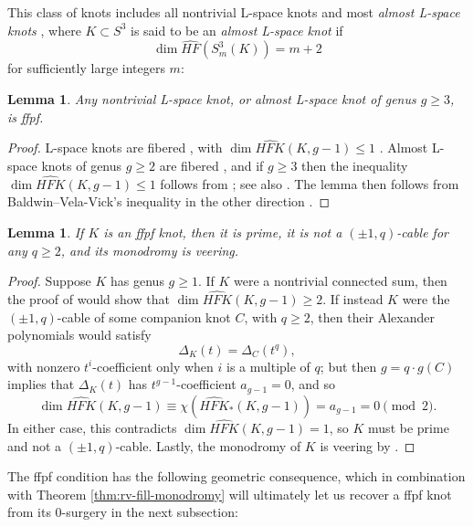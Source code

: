 \documentclass[11pt]{amsart}
\newtheorem {lemma}[theorem]{Lemma}
\numberwithin{equation}{section}
\numberwithin{theorem}{section}
\theoremstyle{definition}
\newcommand\hfk{\mathit{HFK}}
\newcommand\hfkhat{\widehat{\hfk}}
\newcommand{\hfhat}{\widehat{\mathit{HF}}}
\begin{document}
This class of knots includes all nontrivial L-space knots and most \emph{almost L-space knots} \cite{bs-characterizing}, where  $K\subset S^3$ is  said to be an \emph{almost L-space knot}  if \[\dim\hfhat(S^3_m(K)) = m+2\] for sufficiently large integers $m$:

\begin{lemma} \label{lem:ffpf-examples}
Any nontrivial L-space knot, or almost L-space knot of genus $g\geq 3$, is ffpf.
\end{lemma}

\begin{proof}
L-space knots are fibered \cite{ghiggini,ni-hfk}, with $\dim \hfkhat(K,g-1) \leq 1$  \cite[Theorem~1.2]{osz-lens}.  Almost L-space knots of genus $g \geq 2$ are fibered  \cite[Proposition~3.9]{bs-characterizing}, and if $g \geq 3$ then the inequality $\dim \hfkhat(K,g-1) \leq 1$ follows from \cite[Remark~3.12]{bs-characterizing}; see also \cite{binns-almost}. The lemma then follows from Baldwin--Vela-Vick's  inequality in the other direction \cite{baldwin-velavick}.
\end{proof}


\begin{lemma} \label{lem:hfk-outer-monodromy}
If  $K$ is an ffpf knot, then it is prime, it is not a $(\pm1,q)$-cable for any $q \geq 2$, and its monodromy is veering. 
\end{lemma}

\begin{proof}
Suppose $K$ has genus $g\geq 1$. If $K$ were a nontrivial connected sum, then the proof of \cite[Corollary~1.4]{baldwin-velavick}  would show that $\dim \hfkhat(K,g-1) \geq 2$.  If instead $K$ were the $(\pm1,q)$-cable of some companion knot $C$, with $q \geq 2$, then their Alexander polynomials  would satisfy
\[ \Delta_K(t) = \Delta_C(t^q), \]
with nonzero $t^i$-coefficient only when $i$ is a multiple of $q$; but then $g = q\cdot g(C)$ implies that $\Delta_K(t)$ has $t^{g-1}$-coefficient $a_{g-1} = 0$, and so
\[ \dim \hfkhat(K,g-1) \equiv \chi(\hfkhat_\ast(K,g-1)) = a_{g-1} = 0 \pmod{2}. \]
In either case, this  contradicts $\dim \hfkhat(K,g-1) = 1$, so $K$ must be prime and not a $(\pm1,q)$-cable. Lastly, the monodromy of $K$ is  veering by \cite[Theorem~A.1]{ni-exceptional}.
\end{proof}


The ffpf condition has the following geometric consequence, which in combination with Theorem \ref{thm:rv-fill-monodromy} will ultimately let us recover a ffpf knot from its 0-surgery in the next subsection: 
\end{document}
